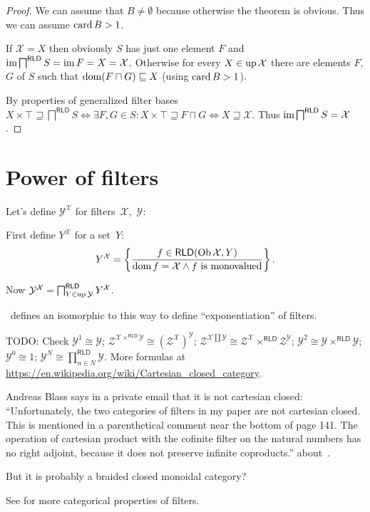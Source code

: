 \begin{proof}
  We can assume that $B \neq \emptyset$ because otherwise the theorem is
  obvious. Thus we can assume $\operatorname{card} B>1$.

  If $\mathcal{X} = X$ then obviously $S$ has just one element $F$ and
  $\operatorname{im} \bigsqcap^{\mathsf{RLD}} S = \operatorname{im} F = X =
  \mathcal{X}$. Otherwise for every $X \in \operatorname{up} \mathcal{X}$ there are
  elements $F$, $G$ of $S$ such that $\operatorname{dom} (F \sqcap G) \sqsubseteq X$
  (using $\operatorname{card} B > 1$).
  
  By properties of generalized filter bases $X \times \top \sqsupseteq
  \bigsqcap^{\mathsf{RLD}} S \Leftrightarrow \exists F, G \in S : X
  \times \top \sqsupseteq F \sqcap G \Leftrightarrow X \sqsupseteq
  \mathcal{X}$. Thus $\operatorname{im} \bigsqcap^{\mathsf{RLD}} S =
  \mathcal{X}$.
\end{proof}

\section{Power of filters}

Let's define $\mathcal{Y}^{\mathcal{X}}$ for filters~$\mathcal{X}$,~$\mathcal{Y}$:

First define $Y^{\mathcal{X}}$ for a set~$Y$:
\[ Y^{\mathcal{X}} = \left\{ \frac{ f \in \mathsf{RLD} (\operatorname{Ob} \mathcal{X}
   , Y) }{ \operatorname{dom} f = \mathcal{X} \wedge f\text{ is monovalued} }\right\} . \]

Now $\mathcal{Y}^{\mathcal{X}} = \bigsqcap^{\mathsf{RLD}}_{Y \in
\operatorname{up} \mathcal{Y}} Y^{\mathcal{X}}$.

\cite{filt-cat}~defines an isomorphic to this way to define ``exponentiation'' of filters.

TODO: Check $\mathcal{Y}^1 \cong \mathcal{Y}$; $\mathcal{Z}^{\mathcal{X}
\times^{\mathsf{RLD}} \mathcal{Y}} \cong
(\mathcal{Z}^{\mathcal{X}})^{\mathcal{Y}}$; $\mathcal{Z}^{\mathcal{X} \amalg
\mathcal{Y}} \cong \mathcal{Z}^{\mathcal{X}} \times^{\mathsf{RLD}}
\mathcal{Z}^{\mathcal{Y}}$; $\mathcal{Y}^2 \cong \mathcal{Y}\times^{\mathsf{RLD}}\mathcal{Y}$;
$\mathcal{Y}^0 \cong 1$; $\mathcal{Y}^N \cong \prod^{\mathsf{RLD}}_{n\in N}\mathcal{Y}$.
More formulas at \url{https://en.wikipedia.org/wiki/Cartesian_closed_category}.

Andreas Blass says in a private email that it is not cartesian closed: ``Unfortunately, the two categories of filters in my paper are
not cartesian closed.  This is mentioned in a parenthetical comment
near the bottom of page 141.  The operation of cartesian product with
the cofinite filter on the natural numbers has no right adjoint,
because it does not preserve infinite coproducts.''
about~\cite{filt-cat}.

But it is probably a braided closed monoidal category?

See \cite{filt-cat} for more categorical properties of filters.